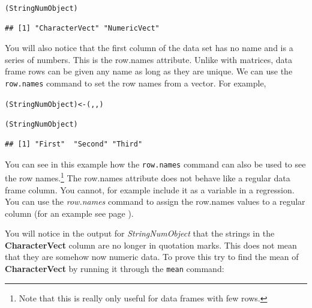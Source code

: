 \begin{knitrout}
\color{fgcolor}\begin{kframe}
\begin{alltt}
(StringNumObject)
\end{alltt}
\begin{verbatim}
## [1] "CharacterVect" "NumericVect"
\end{verbatim}
\end{kframe}
\end{knitrout}


You will also notice that the first column of the data set has no name and is a series of numbers. This is the row.names attribute. Unlike with matrices, data frame rows can be given any name as long as they are unique. We can use the \texttt{row.names} command to set the row names from a vector. For example,

\begin{knitrout}
\color{fgcolor}\begin{kframe}
\begin{alltt}
(StringNumObject) <- (, , )

(StringNumObject)
\end{alltt}
\begin{verbatim}
## [1] "First"  "Second" "Third"
\end{verbatim}
\end{kframe}
\end{knitrout}


You can see in this example how the \texttt{row.names} command can also be used to see the row names.\footnote{Note that this is really only useful for data frames with few rows.} The row.names attribute does not behave like a regular data frame column. You cannot, for example include it as a variable in a regression. You can use the \emph{row.names} command to assign the row.names values to a regular column (for an example see page \pageref{RowNamesTidy}). 

You will notice in the output for \emph{StringNumObject} that the strings in the \textbf{CharacterVect} column are no longer in quotation marks. This does not mean that they are somehow now numeric data. To prove this try to find the mean of \textbf{CharacterVect} by running it through the \texttt{mean} command:

